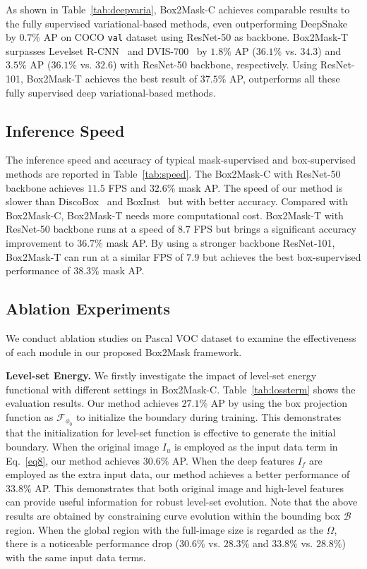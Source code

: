 \documentclass[12pt,onecolumn,letterpaper]{article}
\begin{document}
As shown in Table~\ref{tab:deepvaria}, Box2Mask-C achieves comparable results to the fully supervised variational-based methods, even outperforming  DeepSnake~\cite{peng2020deepsnake} by $0.7\%$ AP on COCO \texttt{val} dataset using ResNet-50 as backbone. Box2Mask-T surpasses Levelset R-CNN~\cite{eccv2020levelset} and DVIS-700~\cite{yuan2020deep} by $1.8\%$ AP ($36.1\%$ vs. $34.3$)  and  $3.5\%$ AP ($36.1\%$ vs. $32.6$)  with ResNet-50 backbone, respectively. Using ResNet-101, Box2Mask-T achieves the best result of $37.5\%$ AP, outperforms all these fully supervised deep variational-based methods.

\subsection{Inference Speed}
The inference speed and accuracy of typical mask-supervised and box-supervised methods are reported in Table~\ref{tab:speed}. 
The Box2Mask-C with ResNet-50 backbone achieves $11.5$ FPS and $32.6\%$ mask AP. The speed of our method is slower than DiscoBox~\cite{iccv2021discobox} and BoxInst~\cite{cvpr2021_boxinst} but with better accuracy. 
Compared with Box2Mask-C, Box2Mask-T needs more computational cost. Box2Mask-T with ResNet-50 backbone runs at a speed of $8.7$ FPS but brings a significant accuracy improvement to $36.7\%$ mask AP. 
By using a stronger backbone ResNet-101, Box2Mask-T can run at a similar FPS of $7.9$ but achieves the best box-supervised performance of $38.3\%$ mask AP.

\subsection{Ablation Experiments}
We conduct ablation studies on Pascal VOC dataset to examine the effectiveness of each module in our proposed Box2Mask framework.


\textbf{Level-set Energy.} We firstly investigate the impact of level-set energy functional with different settings in Box2Mask-C. Table~\ref{tab:lossterm} shows the evaluation results. Our method achieves $27.1\%$ AP by using the box projection function as $\mathcal{F}_{\phi_0}$ to initialize the boundary during training. This demonstrates that the initialization for level-set function is effective to generate the initial boundary. When the original image $I_{u}$ is employed as the input data term in Eq.~\ref{eq8}, our method achieves $30.6\%$ AP. When the deep features $I_{f}$ are employed as the extra input data, our method achieves a better performance of $33.8\%$ AP. This demonstrates that both original image and high-level features can provide useful information for robust level-set evolution. Note that the above results are obtained by constraining curve evolution within the bounding box $\mathcal{B}$ region. When the global region with the full-image size is regarded as the $\Omega$, there is a noticeable performance drop ($30.6\%$ vs. $28.3\%$ and $33.8\%$ vs. $28.8\%$) with the same input data terms. 
\end{document}
